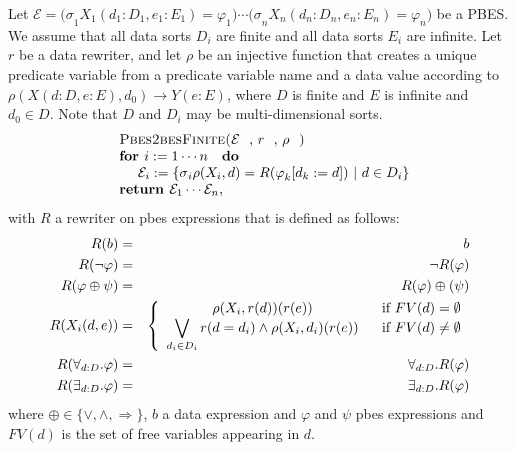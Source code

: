 Let $\mathcal{E=(\sigma }_{1}X_{1}(d_{1}:D_{1},e_{1}:E_{1})=\varphi
_{1})\cdots \mathcal{(\sigma }_{n}X_{n}(d_{n}:D_{n},e_{n}:E_{n})=\varphi
_{n})$ be a PBES. We assume that all data sorts $D_{i}$ are finite and all
data sorts $E_{i}$ are infinite. Let $r$ be a data rewriter, and let $\rho $
be an injective function that creates a unique predicate variable from a
predicate variable name and a data value according to $\rho
(X(d:D,e:E),d_{0})\rightarrow Y(e:E)$, where $D$ is finite and $E$ is
infinite and $d_{0}\in D$. Note that $D$ and $D_{i}$ may be
multi-dimensional sorts.%
\begin{equation*}
\begin{array}{l}
\text{\textsc{Pbes2besFinite(}}\mathcal{E}\text{, }r\text{, }\rho \text{%
\textsc{)}} \\ 
\text{\textbf{for }}i:=1\cdots n\text{ \textbf{do}} \\ 
\qquad \mathcal{E}_{i}:=\{\mathcal{\sigma }_{i}\rho (X_{i},d)=R(\varphi
_{k}[d_{k}:=d])\ |\ d\in D_{i}\} \\ 
\text{\textbf{return }}\mathcal{E}_{1}\cdots \mathcal{E}_{n},%
\end{array}%
\end{equation*}%
with $R$ a rewriter on pbes expressions that is defined as follows:%
\begin{eqnarray*}
R(b) &=&b \\
R(\lnot \varphi ) &=&\lnot R(\varphi ) \\
R(\varphi \oplus \psi ) &=&R(\varphi )\oplus (\psi ) \\
R(X_{i}(d,e)) &=&\left\{ 
\begin{array}{cc}
\rho (X_{i},r(d))(r(e)) & \text{if }FV(d)=\emptyset \\ 
\dbigvee\limits_{d_{i}\in D_{i}}r(d=d_{i})\wedge \rho (X_{i},d_{i})(r(e)) & 
\text{if }FV(d)\neq \emptyset%
\end{array}%
\right. \\
R(\forall _{d:D}.\varphi ) &=&\forall _{d:D}.R(\varphi ) \\
R(\exists _{d:D}.\varphi ) &=&\exists _{d:D}.R(\varphi )
\end{eqnarray*}%
where $\oplus \in \{\vee ,\wedge ,\Rightarrow \}$, $b$ a data expression and 
$\varphi $ and $\psi $ pbes expressions and $FV(d)$ is the set of free
variables appearing in $d$.\newpage
